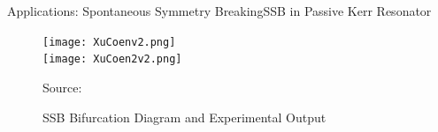 %
%
%

\begin{frame}[c]{Applications: Spontaneous Symmetry Breaking}{SSB in Passive Kerr Resonator}
\begin{figure}[H!]
\centering
\texttt{[image: XuCoenv2.png]} \\
\texttt{[image: XuCoen2v2.png]}
\vspace{-1em}
\caption{SSB Bifurcation Diagram and Experimental Output }
\tiny{Source:~}
\end{figure}
\end{frame}

